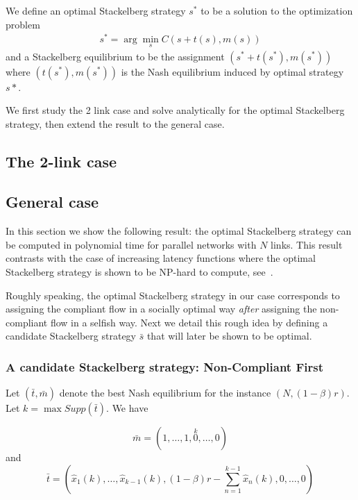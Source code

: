 We define an optimal Stackelberg strategy $s^*$ to be a solution to the optimization problem
\begin{align*}
s^* = \arg \min_s C\left( s + t(s), m(s) \right)
\end{align*}
and a Stackelberg equilibrium to be the assignment $(s^* + t(s^*), m(s^*))$ where $(t(s^*), m(s^*))$ is the Nash equilibrium induced by optimal strategy $s*$.


\bigskip
We first study the 2 link case and solve analytically for the optimal Stackelberg strategy, then extend the result to the general case.

\subsection{The 2-link case}


\subsection{General case}
In this section we show the following result: the optimal Stackelberg strategy can be computed in polynomial time for parallel networks with $N$ links. This result contrasts with the case of increasing latency functions where the optimal Stackelberg strategy is shown to be NP-hard to compute, see~\cite{rou01}.

\bigskip
Roughly speaking, the optimal Stackelberg strategy in our case corresponds to assigning the compliant flow in a socially optimal way \emph{after} assigning the non-compliant flow in a selfish way. Next we detail this rough idea by defining a candidate Stackelberg strategy $\bar{s}$ that will later be shown to be optimal.

\subsubsection{A candidate Stackelberg strategy: Non-Compliant First}
Let $(\bar{t}, \bar{m})$ denote the best Nash equilibrium for the instance $(N, (1-\beta)r)$. Let $k = \max Supp(\bar{t})$. We have

\[
\bar{m} = (1, \dots, 1, \stackrel{k}{0}, \dots, 0)
\]
and
\[
\bar{t} = \left( 
\hat{x}_1(k), \dots, \hat{x}_{k - 1}(k), 
(1 - \beta)r - \sum_{n = 1}^{k - 1} \hat{x}_n(k), 
0, \dots, 0 \right)
\]

